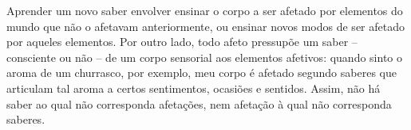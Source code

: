 Aprender um novo saber envolver ensinar o corpo a ser afetado por elementos do mundo que não o afetavam anteriormente, ou ensinar novos modos de ser afetado por aqueles elementos. Por outro lado, todo afeto pressupõe um saber -- consciente ou não -- de um corpo sensorial aos elementos afetivos: quando sinto o aroma de um churrasco, por exemplo, meu corpo é afetado segundo saberes que articulam tal aroma a certos sentimentos, ocasiões e sentidos. Assim, não há saber ao qual não corresponda afetações, nem afetação à qual não corresponda saberes.